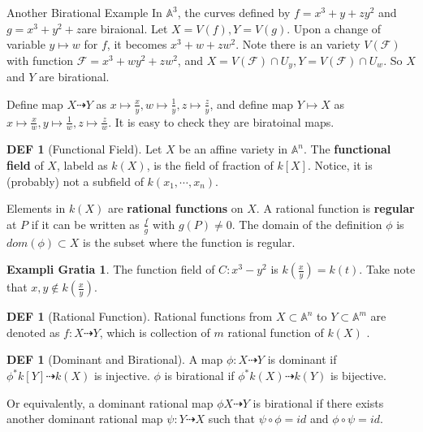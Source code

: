 \documentclass[twocolumn]{article}
\renewcommand{\emph}[1]{{\color{blue!70!black}\sffamily\bfseries #1}}
\newcommand{\A}{\mathbb{A}}
\theoremstyle{definition}
\newtheorem{example}[thm]{Exampli Gratia}
\newtheorem{defi}[thm]{DEF}
\theoremstyle{remark}
\begin{document}
\begin{eg}{Another Birational Example}{}
	In $\A^3$, the curves defined by $f = x^3+y+zy^2$ and $g = x^3 + y^2 + z$are biraional. 
	Let $X = V(f), Y = V(g)$.
	Upon a change of variable $y \mapsto w$ for $f$, it becomes $x^3 + w + zw^2$. 
	Note there is an variety $V(\mathscr{F})$ with function $\mathscr{F} = x^3 + wy^2 + zw^2$, and $X = V(\mathscr{F}) \cap U_y, Y = V(\mathscr{F}) \cap U_w $. 
	So $X$ and $Y$ are birational.

	Define map $X \dasharrow Y$ as $x \mapsto \frac{x}{y}, w \mapsto \frac{1}{y}, z \mapsto \frac{z}{y}$, and define map $Y \mapsto X$ as $x \mapsto \frac{x}{w}, y \mapsto \frac{1}{w}, z \mapsto \frac{z}{w}$. 
	It is easy to check they are biratoinal maps.
\end{eg}

\begin{defi}[Functional Field]
	Let $X$ be an affine variety in $\A^n$. The \emph{functional field} of $X$, labeld as $k(X)$, is the field of fraction of $k[X]$. 
	Notice, it is (probably) not a subfield of $k(x_1, \cdots, x_n)$.

	Elements in $k(X)$ are \emph{rational functions} on $X$.
	A rational function is \emph{regular} at $P$ if it can be written as $\frac{f}{g}$ with $g(P) \neq 0$.
	The domain of the definition $\phi$ is $dom(\phi) \subset X$ is the subset where the function is regular.
\end{defi}

\begin{example}
	The function field of $C: x^3 - y^2$ is $k(\frac{x}{y}) = k(t)$. Take note that $x, y \notin k(\frac{x}{y})$.
\end{example}

\begin{defi}[Rational Function]
	Rational functions from $X \subset \A^n$ to $Y \subset \A^m$ are denoted as $f: X \dasharrow Y$, which is collection of $m$ rational function of $k(X)$ .
\end{defi}

\begin{defi}[Dominant and Birational]
	A map $\phi: X \dasharrow Y$ is dominant if $\phi^* k[Y] \dasharrow k(X)$ is injective.
	$\phi$ is birational if $\phi^* k(X) \dasharrow k(Y)$ is bijective.

	Or equivalently, a dominant rational map $\phi X \dasharrow Y$ is birational if there exists another dominant rational map $\psi: Y \dasharrow X$ such that $\psi \circ \phi = id$ and $\phi \circ \psi = id$.
\end{defi}
\end{document}
